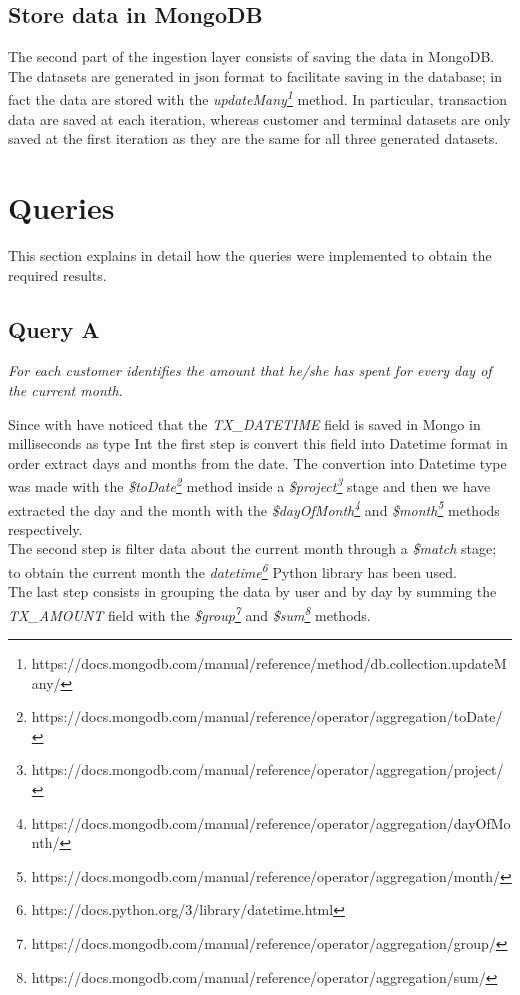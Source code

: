 \documentclass[runningheads]{llncs}
\begin{document}
\subsection{Store data in MongoDB}

The second part of the ingestion layer consists of saving the data in MongoDB. The datasets are generated in json format to facilitate saving in the database; in fact the data are stored with the \emph{updateMany\footnote{https://docs.mongodb.com/manual/reference/method/db.collection.updateMany/}} method. In particular, transaction data are saved at each iteration, whereas customer and terminal datasets are only saved at the first iteration as they are the same for all three generated datasets.

\section{Queries}

This section explains in detail how the queries were implemented to obtain the required results.

\subsection{Query A}

\emph{For each customer identifies the amount that he/she has spent for every day of the current month.}

\hfill

Since with have noticed that the \emph{TX\_DATETIME} field is saved in Mongo in milliseconds as type Int the first step is convert this field into Datetime format in order extract days and months from the date. The  convertion into Datetime type was made with the \emph{\$toDate\footnote{https://docs.mongodb.com/manual/reference/operator/aggregation/toDate/}} method inside a \emph{\$project\footnote{https://docs.mongodb.com/manual/reference/operator/aggregation/project/}} stage and then we have extracted the day and the month with the \emph{\$dayOfMonth\footnote{https://docs.mongodb.com/manual/reference/operator/aggregation/dayOfMonth/}} and \emph{\$month\footnote{https://docs.mongodb.com/manual/reference/operator/aggregation/month/}} methods respectively.\\
The second step is filter data about the current month through a \emph{\$match} stage; to obtain the current month the \emph{datetime\footnote{https://docs.python.org/3/library/datetime.html}} Python library has been used.\\
The last step consists in grouping the data by user and by day by summing the \emph{TX\_AMOUNT} field with the \emph{\$group\footnote{https://docs.mongodb.com/manual/reference/operator/aggregation/group/}} and \emph{\$sum\footnote{https://docs.mongodb.com/manual/reference/operator/aggregation/sum/}} methods.
\end{document}
